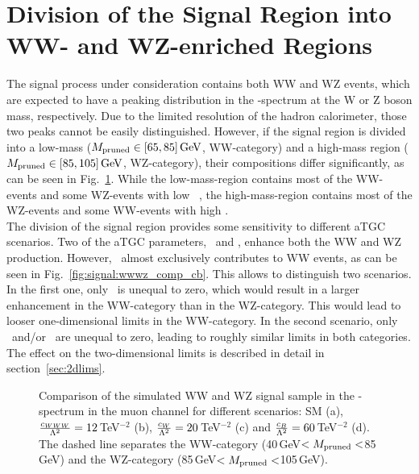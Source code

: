 \section{Division of the Signal Region into WW- and WZ-enriched Regions}
\label{sec:wwwzregs}
The signal process under consideration contains both WW and WZ events, which are expected to have a peaking distribution in the \Mpr -spectrum at the W or Z boson mass, respectively. Due to the limited resolution of the hadron calorimeter, those two peaks cannot be easily distinguished. However, if the signal region is divided into a low-mass ($M_\mathrm{pruned} \in [65,85]\,{\rm GeV}$, WW-category) and a high-mass region ($M_\mathrm{pruned} \in [85,105]\,{\rm GeV}$, WZ-category), their compositions differ significantly, as can be seen in Fig.~\ref{fig:signal:wwwz_comp}. While the low-mass-region contains most of the WW-events and some WZ-events with low \Mpr \ , the high-mass-region contains most of the WZ-events and some WW-events with high \Mpr .\\

\noindent The division of the signal region provides some sensitivity to different aTGC scenarios. Two of the aTGC parameters, \Tcwww \ and \Tccw , enhance both the WW and WZ production. However, \Tcb \ almost exclusively contributes to WW events, as can be seen in Fig.~\ref{fig:signal:wwwz_comp_cb}. This allows to distinguish two scenarios. In the first one, only \Tcb \ is unequal to zero, which would result in a larger enhancement in the WW-category than in the WZ-category. This would lead to looser one-dimensional limits in the WW-category. In the second scenario, only \Tcwww \ and/or \Tccw \ are unequal to zero, leading to roughly similar limits in both categories. The effect on the two-dimensional limits is described in detail in section~\ref{sec:2dlims}.
\begin{figure}
	\centering
	\caption[Comparison of the simulated WW and WZ signal sample in the \Mpr -spectrum in the muon channel]{Comparison of the simulated WW and WZ signal sample in the \Mpr -spectrum in the muon channel for different scenarios: SM (a), $\frac{c_{WWW}}{\Lambda^2}=12$\,TeV$^{-2}$ (b), $\frac{c_{W}}{\Lambda^2}=20$\,TeV$^{-2}$ (c) and $\frac{c_{B}}{\Lambda^2}=60$\,TeV$^{-2}$ (d). The dashed line separates the WW-category (40\,GeV$<M_\mathrm{pruned}<$85\,GeV) and the WZ-category (85\,GeV$<M_\mathrm{pruned}<$105\,GeV).}
	\label{fig:signal:wwwz_comp}
\end{figure}


